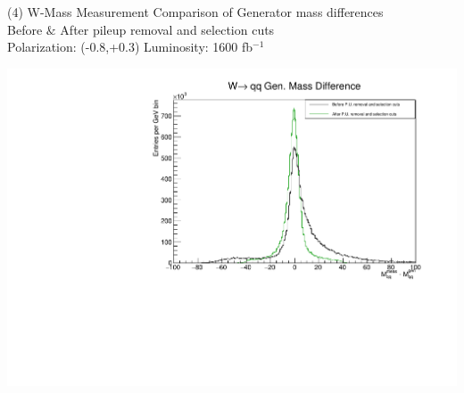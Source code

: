\documentclass[10pt]{beamer}
\begin{document}
\begin{frame}{(4) W-Mass Measurement }
Comparison of Generator mass differences\\
Before $\&$ After  pileup removal and selection cuts \\
Polarization: (-0.8,+0.3)\quad
Luminosity: 1600 fb$^{-1}$\\

\begin{center}
\includegraphics[scale=0.4]{moneymassdiff.pdf} \\
\end{center}


\end{frame}
\end{document}
